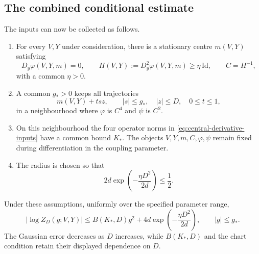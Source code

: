 \documentclass[10pt,reqno]{amsart}
\theoremstyle{definition}
\theoremstyle{remark}
\numberwithin{equation}{section}
\numberwithin{figure}{section}
\begin{document}
\subsection{The combined conditional estimate}
The inputs can now be collected as follows.
\begin{enumerate}[label=(\roman*)]
\item For every $V,Y$ under consideration, there is a stationary centre
$m(V,Y)$ satisfying
\begin{equation}\label{eq:combined-stationary-input}
D_y\varphi(V,Y,m)=0,\qquad
H(V,Y):=D_y^2\varphi(V,Y,m)\ge\eta\,\mathrm{Id},\qquad C=H^{-1},
\end{equation}
with a common $\eta>0$.
\item A common $g_*>0$ keeps all trajectories
\begin{equation}\label{eq:combined-smooth-neighbourhood}
m(V,Y)+tsz,\qquad |s|\le g_*,\quad |z|\le D,\quad 0\le t\le1,
\end{equation}
in a neighbourhood where $\varphi$ is $C^4$ and $\psi$ is $C^2$.
\item On this neighbourhood the four operator norms in
\eqref{eq:central-derivative-inputs} have a common bound $K_*$.
The objects $V,Y,m,C,\varphi,\psi$ remain fixed during differentiation
in the coupling parameter.
\item The radius is chosen so that
\begin{equation}\label{eq:small-central-tail-input}
2d\exp\left(-\frac{\eta D^2}{2d}\right)\le\frac12.
\end{equation}
\end{enumerate}
Under these assumptions, uniformly over the specified parameter range,
\begin{equation}\label{eq:combined-central-log-bound}
\boxed{
|\log Z_D(g;V,Y)|
\le B(K_*,D)g^2+4d\exp\left(-\frac{\eta D^2}{2d}\right),
\qquad |g|\le g_*.
}
\end{equation}
The Gaussian error decreases as $D$ increases, while $B(K_*,D)$ and
the chart condition retain their displayed dependence on $D$.
\end{document}
